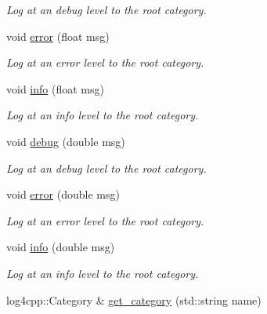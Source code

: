 \begin{DoxyCompactItemize}
\begin{DoxyCompactList}\small\item\em Log at an debug level to the root category. \end{DoxyCompactList}\item 
\hypertarget{classLogger_ac6428b12d3dc4a10b486e8136b7b071c}{void \hyperlink{classLogger_ac6428b12d3dc4a10b486e8136b7b071c}{error} (float msg)}\label{classLogger_ac6428b12d3dc4a10b486e8136b7b071c}

\begin{DoxyCompactList}\small\item\em Log at an error level to the root category. \end{DoxyCompactList}\item 
\hypertarget{classLogger_a6cba3dc43a5470d3981738d975ef7db6}{void \hyperlink{classLogger_a6cba3dc43a5470d3981738d975ef7db6}{info} (float msg)}\label{classLogger_a6cba3dc43a5470d3981738d975ef7db6}

\begin{DoxyCompactList}\small\item\em Log at an info level to the root category. \end{DoxyCompactList}\item 
\hypertarget{classLogger_a356a22cc751f55fb5a1d21b7469ca4d6}{void \hyperlink{classLogger_a356a22cc751f55fb5a1d21b7469ca4d6}{debug} (double msg)}\label{classLogger_a356a22cc751f55fb5a1d21b7469ca4d6}

\begin{DoxyCompactList}\small\item\em Log at an debug level to the root category. \end{DoxyCompactList}\item 
\hypertarget{classLogger_a00baa028ed96f25f4e8f97265c9fbc3f}{void \hyperlink{classLogger_a00baa028ed96f25f4e8f97265c9fbc3f}{error} (double msg)}\label{classLogger_a00baa028ed96f25f4e8f97265c9fbc3f}

\begin{DoxyCompactList}\small\item\em Log at an error level to the root category. \end{DoxyCompactList}\item 
\hypertarget{classLogger_a4ddb5dc42bef5f6d321bede8b8d08fab}{void \hyperlink{classLogger_a4ddb5dc42bef5f6d321bede8b8d08fab}{info} (double msg)}\label{classLogger_a4ddb5dc42bef5f6d321bede8b8d08fab}

\begin{DoxyCompactList}\small\item\em Log at an info level to the root category. \end{DoxyCompactList}\item 
\hypertarget{classLogger_a8b717751752977a44ad7e4982dddd310}{log4cpp\-::\-Category \& \hyperlink{classLogger_a8b717751752977a44ad7e4982dddd310}{get\-\_\-category} (std\-::string name)}\label{classLogger_a8b717751752977a44ad7e4982dddd310}


\end{DoxyCompactItemize}
